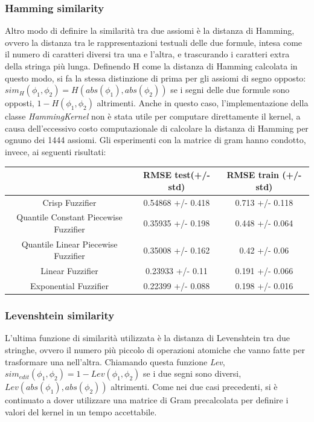 \documentclass[12pt,a4paper]{report}
\begin{document}
\subsubsection{Hamming similarity}
Altro modo di definire la similarità tra due assiomi è la distanza di Hamming, ovvero la distanza tra le rappresentazioni testuali delle due formule, intesa come il numero di caratteri diversi tra una e l'altra, e trascurando i caratteri extra della stringa più lunga.
Definendo H come la distanza di Hamming calcolata in questo modo, si fa la stessa distinzione di prima per gli assiomi di segno opposto:  $sim_{H}(\phi_1, \phi_2) = H(abs(\phi_1),abs(\phi_2))$ se i segni delle due formule sono opposti, $1 - H(\phi_1, \phi_2)$ altrimenti.
Anche in questo caso, l'implementazione della classe \emph{HammingKernel} non è stata utile per computare direttamente il kernel, a causa dell'eccessivo costo computazionale di calcolare la distanza di Hamming per ognuno dei 1444 assiomi. Gli esperimenti con la matrice di gram hanno condotto, invece, ai seguenti risultati:

\begin{table}[h!]
\small
\centering 	
	\begin{tabular}{|c|c|c|} 
	 \hline
	  & RMSE test(+/- std) & RMSE train (+/- std)\\ [0.5ex] 
	 \hline
	 Crisp Fuzzifier & 0.54868 +/- 0.418 & 0.713 +/- 0.118 \\ 
	 \hline
	 Quantile Constant Piecewise Fuzzifier & 0.35935 +/- 0.198 & 0.448 +/- 0.064\\
	 \hline
	 Quantile Linear Piecewise Fuzzifier & 0.35008 +/- 0.162 & 0.42 +/- 0.06\\
	 \hline
	 Linear Fuzzifier &0.23933 +/- 0.11 & 0.191 +/- 0.066\\
	 \hline
	 Exponential Fuzzifier & 0.22399 +/- 0.088 & 0.198 +/- 0.016\\ [1ex] 
	 \hline
	\end{tabular}
\end{table}

\subsubsection{Levenshtein similarity}
L'ultima funzione di similarità utilizzata è la distanza di Levenshtein tra due stringhe, ovvero il numero più piccolo di operazioni atomiche che vanno fatte per trasformare una nell'altra. Chiamando questa funzione \emph{Lev}, $sim_{edit}(\phi_1, \phi_2) = 1 - Lev(\phi_1,\phi_2)$ se i due segni sono diversi, $Lev(abs(\phi_1),abs(\phi_2))$ altrimenti.
Come nei due casi precedenti, si è continuato a dover utilizzare una matrice di Gram precalcolata per definire i valori del kernel in un tempo accettabile.
\end{document}
